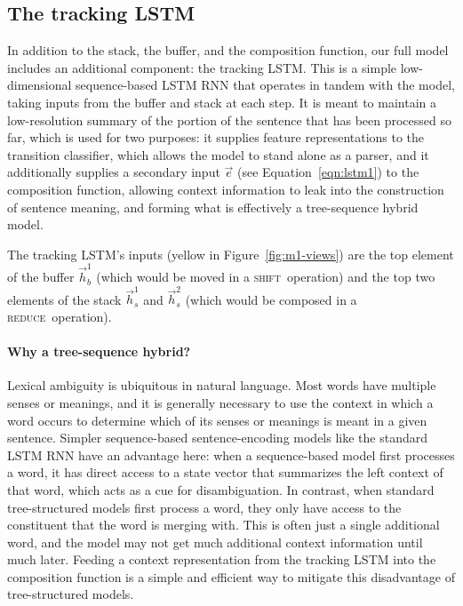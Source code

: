 \documentclass[11pt]{article}
\newcommand{\shift}{\textsc{shift}}
\newcommand{\reduce}{\textsc{reduce}}
\begin{document}
\subsection{The tracking LSTM}\label{sec:tracking}

In addition to the stack, the buffer, and the composition function, our full model includes an additional component: the tracking LSTM. This is a simple low-dimensional sequence-based LSTM RNN that operates in tandem with the model, taking inputs from the buffer and stack at each step. It is meant to maintain a low-resolution summary of the portion of the sentence that has been processed so far, which is used for two purposes: it supplies feature representations to the transition classifier, which allows the model to stand alone as a parser, and it additionally supplies a secondary input $\vec{e}$ (see Equation~\ref{eqn:lstm1}) to the composition function, allowing context information to leak into the construction of sentence meaning, and forming what is effectively a tree-sequence hybrid model.

The tracking LSTM's inputs (yellow in Figure~\ref{fig:m1-views}) are the top element of the buffer $\vec{h}_b^1$ (which would be moved in a \shift\ operation) and the top two elements of the stack $\vec{h}_s^1$ and $\vec{h}_s^2$ (which would be composed in a \reduce\ operation).

\paragraph{Why a tree-sequence hybrid?} 

Lexical ambiguity is ubiquitous in natural language. Most words have multiple senses or meanings, and it is generally necessary to use the context in which a word occurs to determine which of its senses or meanings is meant in a given sentence. Simpler sequence-based sentence-encoding models like the standard LSTM RNN have an advantage here: when a sequence-based model first processes a word, it has direct access to a state vector that summarizes the left context of that word, which acts as a cue for disambiguation. In contrast, when standard tree-structured models first process a word, they only have access to the constituent that the word is merging with. This is often just a single additional word, and the model may not get much additional context information until much later. Feeding a context representation from the tracking LSTM into the composition function is a simple and efficient way to mitigate this disadvantage of tree-structured models. 
\end{document}
